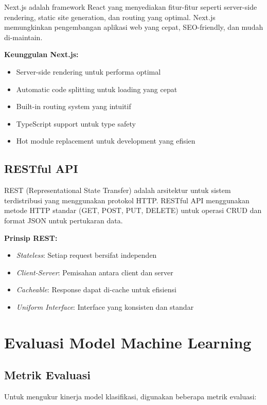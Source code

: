 Next.js adalah framework React yang menyediakan fitur-fitur seperti server-side rendering, static site generation, dan routing yang optimal. Next.js memungkinkan pengembangan aplikasi web yang cepat, SEO-friendly, dan mudah di-maintain.

\textbf{Keunggulan Next.js:}
\begin{itemize}
    \item Server-side rendering untuk performa optimal
    \item Automatic code splitting untuk loading yang cepat
    \item Built-in routing system yang intuitif
    \item TypeScript support untuk type safety
    \item Hot module replacement untuk development yang efisien
\end{itemize}

\subsection{RESTful API}

REST (Representational State Transfer) adalah arsitektur untuk sistem terdistribusi yang menggunakan protokol HTTP. RESTful API menggunakan metode HTTP standar (GET, POST, PUT, DELETE) untuk operasi CRUD dan format JSON untuk pertukaran data.

\textbf{Prinsip REST:}
\begin{itemize}
    \item \textit{Stateless}: Setiap request bersifat independen
    \item \textit{Client-Server}: Pemisahan antara client dan server
    \item \textit{Cacheable}: Response dapat di-cache untuk efisiensi
    \item \textit{Uniform Interface}: Interface yang konsisten dan standar
\end{itemize}

\section{Evaluasi Model Machine Learning}

\subsection{Metrik Evaluasi}

Untuk mengukur kinerja model klasifikasi, digunakan beberapa metrik evaluasi:

